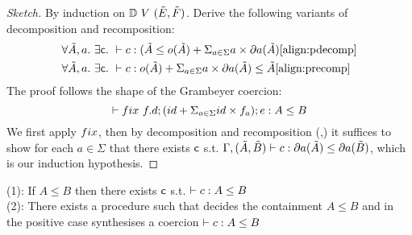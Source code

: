 \documentclass[a4paper,UKenglish,cleveref, autoref, thm-restate]{lipics-v2021}
\newcommand\mycomment[1]{}
\begin{document}
\begin{proof}[Sketch]
By induction on $\mathbb{D}~{V}~(\tilde{E},\tilde{F})$. Derive the following variants of decomposition and recomposition:
\begin{align}
&\forall \tilde{A},a.~\exists \dslcom{c}.~\contains{}{c}{(\tilde{A}}{\myo{\tilde{A}} + \Sigma_{a \in \Sigma} a \times \mypar{a}{\tilde{A}}} \ref{align:pdecomp}\\
&\forall \tilde{A},a.~\exists \dslcom{c}.~\contains{}{c}
{\myo{\tilde{A}} + \Sigma_{a \in \Sigma} a \times \mypar{a}{\tilde{A}}}
{\tilde{A}} \ref{align:precomp}
\end{align}
The proof follows the shape of the Grambeyer coercion:
\[\contains{}{\fix ~f.d;(id + \Sigma_{a \in \Sigma} id\times f_a); e}{A}{B}\]
We first apply $\fix$, then by decomposition and recomposition (\label{align:pdecomp},\label{align:precomp}) it suffices to show for each $a \in \Sigma$ that there exists $\textsf{c}$ s.t. $\contains{\Gamma,\pder{A}{B}}{c}{\mypar{a}{\tilde{A}}}{\mypar{a}{\tilde{B}}}$, which is our induction hypothesis.
\end{proof}
\begin{corollary}
\mycomment{Mention this is compact decision procedure for equivalence, point to file}
(1): If $A \leq B$ then there exists $\textsf{c}$ s.t. $\contains{}{c}{A}{B}$\\
(2): There exists a procedure such that decides the containment $ A \leq B$ and in the positive case synthesises a coercion $\contains{}{c}{A}{B}$
\end{corollary}




\end{document}
